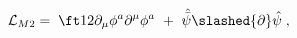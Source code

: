 \begin{equation}
{\cal L}_{M2}=  \; \ft12 \partial_\mu \phi^a \partial^\mu \phi^a\ +\ \hat{\bar{\psi}}
\slashed{\partial}\hat{\psi}\; ,
\label{n81}
\end{equation}

